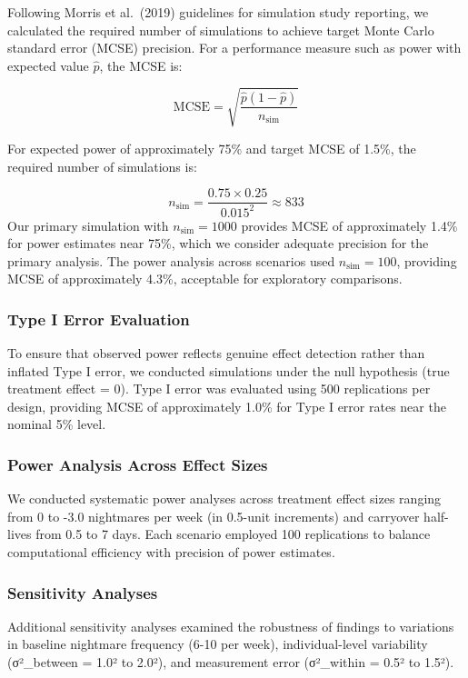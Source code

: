 \documentclass[
  11pt,
]{article}
\begin{document}
Following Morris et al.~(2019) guidelines for simulation study
reporting, we calculated the required number of simulations to achieve
target Monte Carlo standard error (MCSE) precision. For a performance
measure such as power with expected value \(\hat{p}\), the MCSE is:

\[\text{MCSE} = \sqrt{\frac{\hat{p}(1-\hat{p})}{n_{\text{sim}}}}\]

For expected power of approximately 75\% and target MCSE of 1.5\%, the
required number of simulations is:

\[n_{\text{sim}} = \frac{0.75 \times 0.25}{0.015^2} \approx 833\] Our
primary simulation with \(n_{\text{sim}} = 1000\) provides MCSE of
approximately 1.4\% for power estimates near 75\%, which we consider
adequate precision for the primary analysis. The power analysis across
scenarios used \(n_{\text{sim}} = 100\), providing MCSE of approximately
4.3\%, acceptable for exploratory comparisons.

\subsubsection{Type I Error Evaluation}\label{type-i-error-evaluation}

To ensure that observed power reflects genuine effect detection rather
than inflated Type I error, we conducted simulations under the null
hypothesis (true treatment effect = 0). Type I error was evaluated using
500 replications per design, providing MCSE of approximately 1.0\% for
Type I error rates near the nominal 5\% level.

\subsubsection{Power Analysis Across Effect
Sizes}\label{power-analysis-across-effect-sizes}

We conducted systematic power analyses across treatment effect sizes
ranging from 0 to -3.0 nightmares per week (in 0.5-unit increments) and
carryover half-lives from 0.5 to 7 days. Each scenario employed 100
replications to balance computational efficiency with precision of power
estimates.

\subsubsection{Sensitivity Analyses}\label{sensitivity-analyses}

Additional sensitivity analyses examined the robustness of findings to
variations in baseline nightmare frequency (6-10 per week),
individual-level variability (σ²\_between = 1.0² to 2.0²), and
measurement error (σ²\_within = 0.5² to 1.5²).
\end{document}
